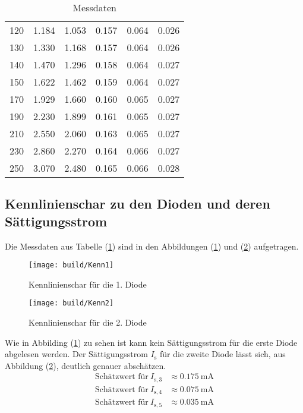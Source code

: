 \begin{table}[H]
\begin{tabular}{c||c|c|c|c|c}
      120	& 1.184 & 1.053 & 0.157	& 0.064	& 0.026 \\
      130	& 1.330 & 1.168 & 0.157	& 0.064	& 0.026 \\
      140	& 1.470 & 1.296 & 0.158	& 0.064	& 0.027 \\
      150	& 1.622 & 1.462 & 0.159	& 0.064	& 0.027 \\
      170	& 1.929 & 1.660 & 0.160	& 0.065	& 0.027 \\
      190	& 2.230 & 1.899 & 0.161	& 0.065	& 0.027 \\
      210	& 2.550 & 2.060 & 0.163	& 0.065	& 0.027 \\
      230	& 2.860 & 2.270 & 0.164	& 0.066	& 0.027 \\
      250	& 3.070 & 2.480 & 0.165	& 0.066	& 0.028 \\
      \bottomrule
    \end{tabular}
    \caption{Messdaten }
    \label{tab:Messdaten1}
  \end{table}

\subsection{Kennlinienschar zu den Dioden und deren Sättigungsstrom}
\label{sec:K}
Die Messdaten aus Tabelle (\ref{tab:Messdaten1}) sind in den Abbildungen (\ref{fig:Kenn1}) und (\ref{fig:Kenn2}) aufgetragen.

\begin{figure}[H] %
  \centering
  \texttt{[image: build/Kenn1]}
  \caption{Kennlinienschar für die 1. Diode}
  \label{fig:Kenn1}
\end{figure}

\begin{figure}[H] %
  \centering
  \texttt{[image: build/Kenn2]}
  \caption{Kennlinienschar für die 2. Diode}
  \label{fig:Kenn2}
\end{figure}

Wie in Abbilding (\ref{fig:Kenn1}) zu sehen ist kann kein Sättigungsstrom für die erste Diode abgelesen werden. Der Sättigungsstrom $I_\text{s}$ für die zweite Diode lässt sich, aus Abbildung (\ref{fig:Kenn2}), deutlich genauer abschätzen.
\begin{align*}
  \text{Schätzwert für}\ I_{\text{s},3} & \approx 0.175 \ \text{mA} \\
  \text{Schätzwert für}\ I_{\text{s},4} & \approx 0.075 \ \text{mA} \\
  \text{Schätzwert für}\ I_{\text{s},5} & \approx 0.035 \ \text{mA}
\end{align*}

